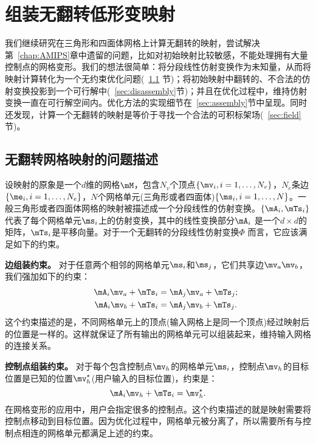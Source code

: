 ﻿\chapter{组装无翻转低形变映射} \label{chap:affine}
我们继续研究在三角形和四面体网格上计算无翻转的映射，尝试解决第~\ref{chap:AMIPS}章中遗留的问题，比如对初始映射比较敏感，不能处理拥有大量控制点的网格变形。我们的想法很简单：将分段线性仿射变换作为未知量，从而将映射计算转化为一个无约束优化问题(~\ref{sec:affine} 节)；将初始映射中翻转的、不合法的仿射变换投影到一个可行解中(~\ref{sec:disassembly}节)；并且在优化过程中，维持仿射变换一直在可行解空间内。优化方法的实现细节在~\ref{sec:assembly}节中呈现。同时还发现，计算一个无翻转的映射是等价于寻找一个合法的可积标架场(~\ref{sec:field} 节)。

\section{无翻转网格映射的问题描述} \label{sec:affine}
设映射的原象是一个$d$维的网格$\mM$，包含$N_v$个顶点$\{\mv_i, i=1,\ldots,N_v\}$，$N_e$条边$ \{\me_i, i=1,\ldots,N_e\}$，$N$个网格单元(三角形或者四面体)$\{\ms_i, i=1,\ldots, N\}$。一般三角形或者四面体网格的映射被描述成一个分段线性的仿射变换\cite{Lipman2012,Aigerman2013}。$\{\mA_i,\mTs_i\}$ 代表了每个网格单元$\ms_i$上的仿射变换，其中的线性变换部分$\mA_i$ 是一个$d \times d$的矩阵，$\mTs_i$是平移向量。对于一个无翻转的分段线性仿射变换$\Phi$ 而言，它应该满足如下的约束。

\textbf{边组装约束。} 对于任意两个相邻的网格单元$\ms_i$和$\ms_j$，它们共享边$\mv_a\mv_b$，我们强加如下的约束：
\begin{align}
\mA_i \mv_a + \mTs_i &= \mA_j \mv_a + \mTs_j; \label{eqn:edge_assmebly_old1} \\
\qquad \mA_i \mv_b + \mTs_i &= \mA_j \mv_b + \mTs_j. \label{eqn:edge_assmebly_old2}
\end{align}
这个约束描述的是，不同网格单元上的顶点(输入网格上是同一个顶点)经过映射后的位置是一样的。这样就保证了所有输出的网格单元可以组装起来，维持输入网格的连接关系。

\textbf{控制点组装约束。} 对于每个包含控制点$\mv_h$的网格单元$\ms_i$，控制点$\mv_h$的目标位置是已知的位置$\mv^{\star}_h$(用户输入的目标位置)，约束是：
\begin{equation}
\mA_i \mv_h + \mTs_i = \mv^{\star}_h. \label{eqn:handle_assmebly_old}
\end{equation}
在网格变形的应用中，用户会指定很多的控制点。这个约束描述的就是映射需要将控制点移动到目标位置。因为优化过程中，网格单元被分离了，所以需要所有与控制点相连的网格单元都满足上述的约束。

